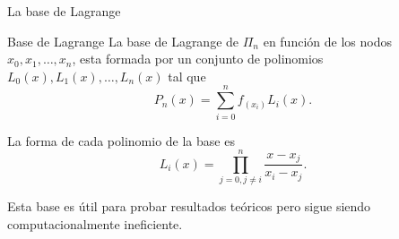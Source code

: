 \begin{frame}{La base de Lagrange}
  \begin{exampleblock}{Base de Lagrange}
    La base de Lagrange de $\Pi_n$ en función de los nodos $x_0, x_1,
    \ldots, x_n$, esta formada por un conjunto de polinomios $L_0(x),
    L_1(x), \ldots, L_n(x)$ tal que
    \[
      P_n(x)=\sum_{i=0}^{n}f_{(x_i)}L_i(x).
    \]

    La forma de cada polinomio de la base es
    \[
      L_i(x)=\prod_{j=0, j \neq i}^{n}\frac{x-x_j}{x_i-x_j}.
    \]
  \end{exampleblock}

  Esta base es útil para \alert{probar resultados teóricos} pero sigue
  siendo \alert{computacionalmente ineficiente}.
\end{frame}

